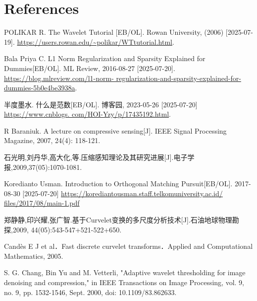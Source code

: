 \documentclass[12pt]{ctexart}
\begin{document}
\newpage
\section*{\textbf{References}}
\begin{enumerate}[label={[\arabic*]}, leftmargin=0pt]
  \raggedright
  \item POLIKAR R. The Wavelet Tutorial [EB/OL]. Rowan University, (2006) [2025-07-19].
  \url{https://users.rowan.edu/~polikar/WTtutorial.html}.
  \item Bala Priya C. L1 Norm Regularization and Sparsity Explained for Dummies[EB/OL].
  ML Review, 2016-08-27 [2025-07-20]. \url{https://blog.mlreview.com/l1-norm-
  regularization-and-sparsity-explained-for-dummies-5b0e4be3938a}.
  \item 半度墨水. 什么是范数[EB/OL]. 博客园, 2023-05-26 [2025-07-20] \url{https://www.cnblogs.
  com/HOI-Yzy/p/17435192.html}.
  \item R Baraniuk. A lecture on compressive sensing[J]. IEEE Signal Processing Magazine,
  2007, 24(4): 118-121.
  \item 石光明,刘丹华,高大化,等.压缩感知理论及其研究进展[J].电子学报,2009,37(05):1070-1081.
  \item Koredianto Usman. Introduction to Orthogonal Matching Pursuit[EB/OL].
  2017-08-30 [2025-07-20] \url{https://korediantousman.staff.telkomuniversity.ac.id/
  files/2017/08/main-1.pdf}
  \item 郑静静,印兴耀,张广智.基于Curvelet变换的多尺度分析技术[J].石油地球物理勘探,2009,
  44(05):543-547+521-522+650.
  \item Candès E J et al．Fast discrete curvelet transforms．Applied and Computational
  Mathematics, 2005.
  \item S. G. Chang, Bin Yu and M. Vetterli, "Adaptive wavelet thresholding for image
  denoising and compression," in IEEE Transactions on Image Processing, vol. 9, no. 9,
  pp. 1532-1546, Sept. 2000, doi: 10.1109/83.862633.
\end{enumerate}
\end{document}
